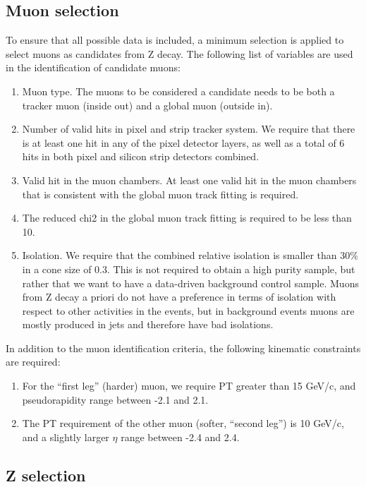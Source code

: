 \documentclass{cmspaper}
\begin{document}
\subsection{Muon selection}

To ensure that all possible data is included, a minimum selection is applied to select muons as candidates from Z decay.
The following list of variables are used in the identification of candidate muons:

\begin{enumerate}
\item Muon type.  The muons to be considered a candidate needs to be both a tracker muon (inside out) and a global muon (outside in).
\item Number of valid hits in pixel and strip tracker system.  We require that there is at least one hit in any of the pixel detector layers,
as well as a total of 6 hits in both pixel and silicon strip detectors combined.
\item Valid hit in the muon chambers.  At least one valid hit in the muon chambers that is consistent with the global muon track fitting is required.
\item The reduced chi2 in the global muon track fitting is required to be less than 10.
\item Isolation.  We require that the combined relative isolation is smaller than 30\% in a cone size of 0.3.
This is not required to obtain a high purity sample, but rather that we want to have a data-driven background control sample.
Muons from Z decay a priori do not have a preference in terms of isolation with respect to other activities in the events,
but in background events muons are mostly produced in jets and therefore have bad isolations.
\end{enumerate}

In addition to the muon identification criteria, the following kinematic constraints are required:

\begin{enumerate}
\item For the ``first leg'' (harder) muon, we require PT greater than 15 GeV/c, and pseudorapidity range between -2.1 and 2.1.
\item The PT requirement of the other muon (softer, ``second leg'') is 10 GeV/c, and a slightly larger $\eta$ range between -2.4 and 2.4.
\end{enumerate}

\subsection{Z selection}
\end{document}
